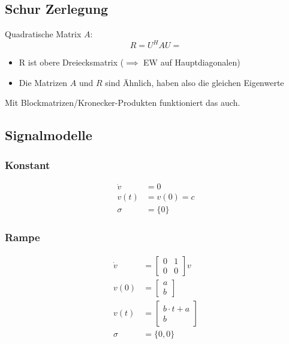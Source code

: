 \subsection{Schur Zerlegung}
Quadratische Matrix $A$:
\begin{equation}
    R=U^H A U = 
\end{equation}
\begin{itemize}
    \item R ist obere Dreiecksmatrix ($\implies$ EW auf Hauptdiagonalen)
    \item Die Matrizen $A$ und $R$ sind Ähnlich, haben also die gleichen Eigenwerte
\end{itemize}

Mit Blockmatrizen/Kronecker-Produkten funktioniert das auch.

\subsection{Signalmodelle}
\subsubsection{Konstant}
\begin{align}
    \dot{v} &= 0 \\
    v(t) &= v(0) = c \\
    \sigma &= \{0\}
\end{align}

\subsubsection{Rampe}
\begin{align}
    \dot{v} &= \begin{bmatrix}
        0 & 1 \\
        0 & 0
    \end{bmatrix} v \\
    v(0) &= \begin{bmatrix}
        a \\ b
    \end{bmatrix} \\
    v(t) &= \begin{bmatrix}
        b \cdot t + a \\
        b
    \end{bmatrix} \\
    \sigma &= \{0, 0\}
\end{align}

